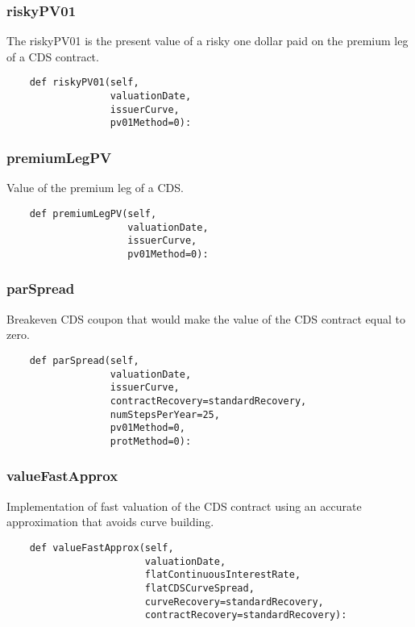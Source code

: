 \documentclass[twoside,11pt]{book}
\begin{document}
\subsubsection*{{\bf riskyPV01}}
The riskyPV01 is the present value of a risky one dollar paid on  the premium leg of a CDS contract.  

\begin{lstlisting}
    def riskyPV01(self,
                  valuationDate,
                  issuerCurve,
                  pv01Method=0):
\end{lstlisting}

\subsubsection*{{\bf premiumLegPV}}
Value of the premium leg of a CDS.  

\begin{lstlisting}
    def premiumLegPV(self,
                     valuationDate,
                     issuerCurve,
                     pv01Method=0):
\end{lstlisting}

\subsubsection*{{\bf parSpread}}
Breakeven CDS coupon that would make the value of the CDS contract  equal to zero.  

\begin{lstlisting}
    def parSpread(self,
                  valuationDate,
                  issuerCurve,
                  contractRecovery=standardRecovery,
                  numStepsPerYear=25,
                  pv01Method=0,
                  protMethod=0):
\end{lstlisting}

\subsubsection*{{\bf valueFastApprox}}
Implementation of fast valuation of the CDS contract using an accurate approximation that avoids curve building.  

\begin{lstlisting}
    def valueFastApprox(self,
                        valuationDate,
                        flatContinuousInterestRate,
                        flatCDSCurveSpread,
                        curveRecovery=standardRecovery,
                        contractRecovery=standardRecovery):
\end{lstlisting}
\end{document}
